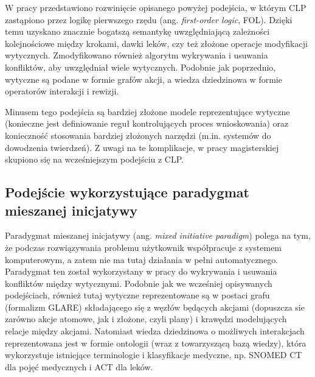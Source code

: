 W pracy \cite{SzWilk} przedstawiono rozwinięcie opisanego powyżej podejścia, w którym CLP zastąpiono przez logikę pierwszego rzędu (ang. \textit{first-order logic}, FOL). Dzięki temu uzyskano znacznie bogatszą semantykę uwzględniającą zależności kolejnościowe między krokami, dawki leków, czy też złożone operacje modyfikacji wytycznych. Zmodyfikowano również algorytm wykrywania i usuwania konfliktów, aby uwzględniał wiele wytycznych. Podobnie jak poprzednio, wytyczne są podane w formie grafów akcji, a wiedza dziedzinowa w formie operatorów interakcji i rewizji.

Minusem tego podejścia są bardziej złożone modele reprezentujące wytyczne (konieczne jest definiowanie reguł kontrolujących proces wnioskowania) oraz konieczność stosowania bardziej złożonych narzędzi (m.in. systemów do dowodzenia twierdzeń). Z uwagi na te komplikacje, w pracy magisterskiej skupiono się na wcześniejszym podejściu z CLP.



\subsection{Podejście wykorzystujące paradygmat mieszanej inicjatywy}

Paradygmat mieszanej inicjatywy (ang. \textit{mixed initiative paradigm}) polega na tym, że podczas rozwiązywania problemu użytkownik współpracuje z systemem komputerowym, a zatem nie ma tutaj działania w pełni automatycznego. Paradygmat ten został wykorzystany w pracy \cite{Piovesan} do wykrywania i usuwania konfliktów między wytycznymi. Podobnie jak we wcześniej opisywanych podejściach, również tutaj wytyczne reprezentowane są w postaci grafu (formalizm GLARE) składającego się z węzłów będących akcjami (dopuszcza sie zarówno akcje atomowe, jak i złożone, czyli plany) i krawędzi modelujących relacje między akcjami. Natomiast wiedza dziedzinowa o możliwych interakcjach reprezentowana jest w formie ontologii (wraz z towarzyszącą bazą wiedzy), która wykorzystuje istniejące terminologie i klasyfikacje medyczne, np. SNOMED CT dla pojęć medycznych i ACT dla leków.
  
